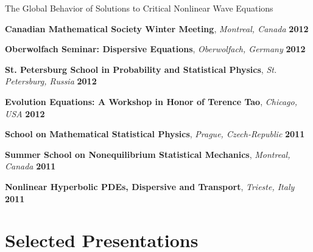 \documentclass[margin,line]{resume}
\begin{document}
\begin{resume}
\vspace{2mm}
    \begin{list2}
        \item The Global Behavior of Solutions to Critical Nonlinear Wave Equations
    \end{list2}
    
\vspace{-2mm}
\textbf{Canadian Mathematical Society Winter Meeting},  \textsl{Montreal, Canada}
\hfill \textbf{2012}%

\vspace{-2mm}      
\textbf{Oberwolfach Seminar: Dispersive Equations},  \textsl{Oberwolfach, Germany}  \hfill \textbf{2012} 

\vspace{-2mm}
\textbf{St. Petersburg School in Probability and Statistical Physics},  \textsl{St. \hspace{-1mm}Petersburg, Russia} \hfill \textbf{2012}

\vspace{-2mm}
\textbf{Evolution Equations: A Workshop in Honor of Terence Tao},  \textsl{Chicago, USA} \hfill \textbf{2012} 

\vspace{-2mm}
\textbf{School on Mathematical Statistical Physics},  \textsl{Prague, Czech-Republic} \hfill \textbf{2011}

\vspace{-2mm}
\textbf{Summer School on Nonequilibrium Statistical Mechanics},  \textsl{Montreal, Canada} \hfill \textbf{2011} 

\vspace{-2mm}
\textbf{Nonlinear Hyperbolic PDEs, Dispersive and Transport},  \textsl{Trieste, Italy} \hfill \textbf{2011} 

    \section{\mysidestyle Selected Presentations}


\end{resume}
\end{document}

